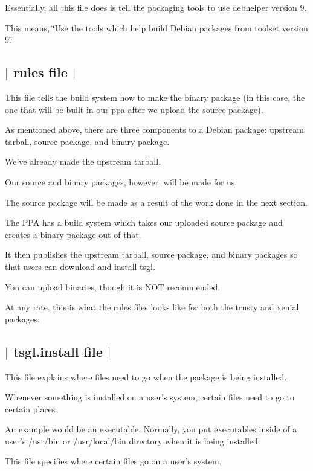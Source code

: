 Essentially, all this file does is tell the packaging tools to use {\ttfamily debhelper} version 9.

This means, \char`\"{}\-Use the tools which help build Debian packages from toolset version 9.\char`\"{} 

 \subsection*{$\vert$ {\ttfamily rules} file $\vert$ }

This file tells the build system how to make the binary package (in this case, the one that will be built in our ppa after we upload the source package).

As mentioned above, there are three components to a Debian package\-: upstream tarball, source package, and binary package.

We've already made the upstream tarball.

Our source and binary packages, however, will be made for us.

The source package will be made as a result of the work done in the next section.

The P\-P\-A has a build system which takes our uploaded source package and creates a binary package out of that.

It then publishes the upstream tarball, source package, and binary packages so that users can download and install tsgl.

You can upload binaries, though it is N\-O\-T recommended.

At any rate, this is what the {\ttfamily rules} files looks like for both the {\ttfamily trusty} and {\ttfamily xenial} packages\-:



 \subsection*{$\vert$ {\ttfamily tsgl.\-install} file $\vert$ }

This file explains where files need to go when the package is being installed.

Whenever something is installed on a user's system, certain files need to go to certain places.

An example would be an executable. Normally, you put executables inside of a user's {\ttfamily /usr/bin} or {\ttfamily /usr/local/bin} directory when it is being installed.

This file specifies where certain files go on a user's system.

